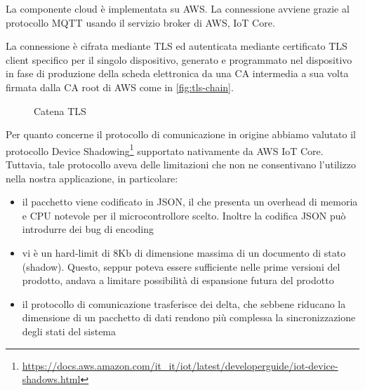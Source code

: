 \documentclass[12pt,a4paper,twoside,titlepage]{book}
\begin{document}
La componente cloud è implementata su AWS. La connessione avviene grazie al protocollo
MQTT usando il servizio broker di AWS, IoT Core.

La connessione è cifrata mediante TLS ed autenticata mediante certificato TLS client
specifico per il singolo dispositivo, generato e programmato nel dispositivo in fase
di produzione della scheda elettronica da una CA intermedia a sua volta firmata dalla
CA root di AWS come in \autoref{fig:tls-chain}.

\begin{figure}[ht]
    \centering
    \caption{Catena TLS}
    \label{fig:tls-chain}
\end{figure}

Per quanto concerne il protocollo di comunicazione in origine abbiamo valutato il
protocollo Device Shadowing\footnote{\url{https://docs.aws.amazon.com/it\_it/iot/latest/developerguide/iot-device-shadows.html}} supportato nativamente da AWS IoT Core. Tuttavia, tale
protocollo aveva delle limitazioni che non ne consentivano l'utilizzo nella nostra
applicazione, in particolare:

\begin{itemize}
    \item il pacchetto viene codificato in JSON, il che presenta un overhead di memoria
        e CPU notevole per il microcontrollore scelto. Inoltre la codifica JSON può
        introdurre dei bug di encoding
    \item vi è un hard-limit di 8Kb di dimensione massima di un documento di stato (shadow).
        Questo, seppur poteva essere sufficiente nelle prime versioni del prodotto, andava
        a limitare possibilità di espansione futura del prodotto
    \item il protocollo di comunicazione trasferisce dei delta, che sebbene riducano la
        dimensione di un pacchetto di dati rendono più complessa la sincronizzazione degli
        stati del sistema
\end{itemize}
\end{document}
